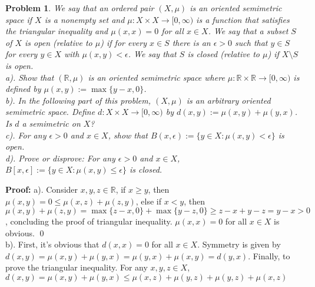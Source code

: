 \documentclass[12pt]{article}
\newtheorem{problem}{Problem}
\begin{document}
\begin{problem}
We say that an ordered pair $(X, \mu)$ is an oriented semimetric space if $X$ is a nonempty set and $\mu: X\times X\to [0,\infty)$ is a function that satisfies the triangular inequality and $\mu(x,x)=0$ for all $x\in X$. We say that a subset $S$ of $X$ is open (relative to $\mu$) if for every $x\in S$ there is an $\epsilon>0$ such that $y\in S$ for every $y\in X$ with $\mu(x,y)<\epsilon$. We say that $S$ is closed (relative to $\mu$) if $X\setminus S$ is open. \\
\indent a). Show that $(\mathbb{R}, \mu)$ is an oriented semimetric space where $\mu: \mathbb{R}\times\mathbb{R}\to [0,\infty)$ is defined by $\mu(x,y):= \max\{y-x,0\}$. \\
\indent b). In the following part of this problem, $(X,\mu)$ is an arbitrary oriented semimetric space. Define $d: X\times X\to [0,\infty)$ by $d(x,y):= \mu(x,y)+\mu(y,x)$. Is $d$ a semimetric on $X$? \\
\indent c). For any $\epsilon>0$ and $x\in X$, show that $B(x,\epsilon):= \{y\in X: \mu(x,y)<\epsilon\}$ is open. \\
\indent d). Prove or disprove: For any $\epsilon >0$ and $x\in X$, $B[x,\epsilon]:=\{y\in X: \mu(x,y)\leq\epsilon\}$ is closed.
\end{problem}

\textbf{Proof:} a). Consider $x,y,z\in\mathbb{R}$, if $x\geq y$, then $\mu(x,y)=0\leq \mu(x,z)+\mu(z,y)$, else if $x < y$, then $\mu(x,y)+\mu(z,y)=\max\{z-x, 0\}+\max\{y-z, 0\}\geq z-x+y-z=y-x>0$, concluding the proof of triangular inequality. $\mu(x,x)=0$ for all $x\in X$ is obvious. \qed
\\
\indent b). First, it's obvious that $d(x,x) = 0$ for all $x\in X$. Symmetry is given by $d(x,y) = \mu(x,y)+\mu(y,x) = \mu(y,x)+\mu(x,y)=d(y,x)$. Finally, to prove the triangular inequality. For any $x,y,z\in X$, $d(x,y)=\mu(x,y)+\mu(y,x)\leq \mu(x,z)+\mu(y, z)+\mu(y, z) +\mu(x, z)$
\end{document}

